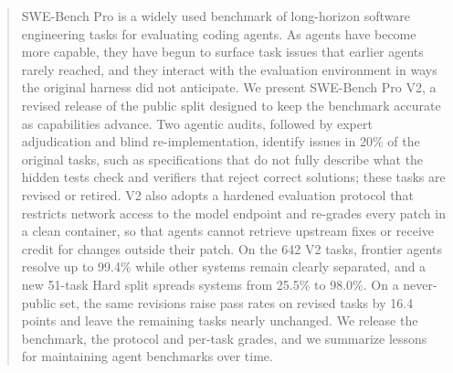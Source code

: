 \begin{abstract}
SWE-Bench Pro is a widely used benchmark of long-horizon software engineering tasks for evaluating coding agents. As agents have become more capable, they have begun to surface task issues that earlier agents rarely reached, and they interact with the evaluation environment in ways the original harness did not anticipate. We present SWE-Bench Pro V2, a revised release of the public split designed to keep the benchmark accurate as capabilities advance. Two agentic audits, followed by expert adjudication and blind re-implementation, identify issues in 20\% of the original tasks, such as specifications that do not fully describe what the hidden tests check and verifiers that reject correct solutions; these tasks are revised or retired. V2 also adopts a hardened evaluation protocol that restricts network access to the model endpoint and re-grades every patch in a clean container, so that agents cannot retrieve upstream fixes or receive credit for changes outside their patch. On the 642 V2 tasks, frontier agents resolve up to 99.4\% while other systems remain clearly separated, and a new 51-task Hard split spreads systems from 25.5\% to 98.0\%. On a never-public set, the same revisions raise pass rates on revised tasks by 16.4 points and leave the remaining tasks nearly unchanged. We release the benchmark, the protocol and per-task grades, and we summarize lessons for maintaining agent benchmarks over time.
\end{abstract}
